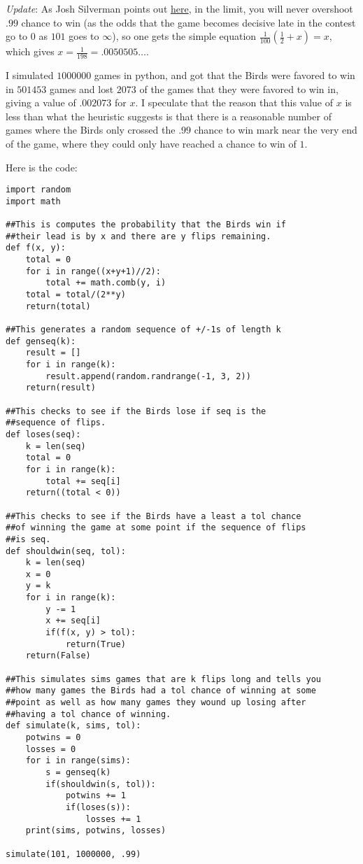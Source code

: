 \documentclass[11pt]{article}
\theoremstyle{definition}
\begin{document}
\emph{Update}: As Josh Silverman points out \href{https://joshmaxsilverman.github.io/2020-11-16-total-collapse/}{here}, in the limit, you will never overshoot $.99$ chance to win (as the odds that the game becomes decisive late in the contest go to $0$ as $101$ goes to $\infty$), so one gets the simple equation $\displaystyle{\frac{1}{100}\left(\frac{1}{2} + x\right) = x}$, which gives $x = \displaystyle{\frac{1}{198} = .0050505\ldots}$.

I simulated $1000000$ games in python, and got that the Birds were favored to win in $501453$ games and lost $2073$ of the games that they were favored to win in, giving a value of $.002073$ for $x$.  I speculate that the reason that this value of $x$ is less than what the heuristic suggests is that there is a reasonable number of games where the Birds only crossed the $.99$ chance to win mark near the very end of the game, where they could only have reached a chance to win of $1$.

Here is the code:
\begin{verbatim}
import random
import math

##This is computes the probability that the Birds win if
##their lead is by x and there are y flips remaining.
def f(x, y):
    total = 0
    for i in range((x+y+1)//2):
        total += math.comb(y, i)
    total = total/(2**y)
    return(total)

##This generates a random sequence of +/-1s of length k
def genseq(k):
    result = []
    for i in range(k):
        result.append(random.randrange(-1, 3, 2))
    return(result)

##This checks to see if the Birds lose if seq is the
##sequence of flips.
def loses(seq):
    k = len(seq)
    total = 0
    for i in range(k):
        total += seq[i]
    return((total < 0))

##This checks to see if the Birds have a least a tol chance
##of winning the game at some point if the sequence of flips
##is seq.
def shouldwin(seq, tol):
    k = len(seq)
    x = 0
    y = k
    for i in range(k):
        y -= 1
        x += seq[i]
        if(f(x, y) > tol):
            return(True)
    return(False)

##This simulates sims games that are k flips long and tells you
##how many games the Birds had a tol chance of winning at some
##point as well as how many games they wound up losing after
##having a tol chance of winning.
def simulate(k, sims, tol):
    potwins = 0
    losses = 0
    for i in range(sims):
        s = genseq(k)
        if(shouldwin(s, tol)):
            potwins += 1
            if(loses(s)):
                losses += 1
    print(sims, potwins, losses)

simulate(101, 1000000, .99)
\end{verbatim}
\end{document}
